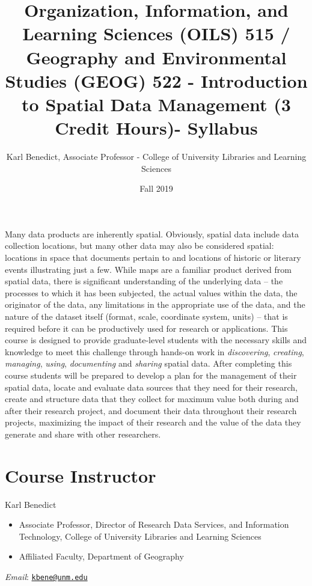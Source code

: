 \documentclass[
]{article}
\title{Organization, Information, and Learning Sciences (OILS) 515 / Geography
and Environmental Studies (GEOG) 522 - Introduction to Spatial Data
Management (3 Credit Hours)- Syllabus}
\author{Karl Benedict, Associate Professor - College of University Libraries and
Learning Sciences}
\date{Fall 2019}
\providecommand{\tightlist}{%
  \setlength{\itemsep}{0pt}\setlength{\parskip}{0pt}}
\begin{document}
\maketitle

Many data products are inherently spatial. Obviously, spatial data
include data collection locations, but many other data may also be
considered spatial: locations in space that documents pertain to and
locations of historic or literary events illustrating just a few. While
maps are a familiar product derived from spatial data, there is
significant understanding of the underlying data -- the processes to
which it has been subjected, the actual values within the data, the
originator of the data, any limitations in the appropriate use of the
data, and the nature of the dataset itself (format, scale, coordinate
system, units) -- that is required before it can be productively used
for research or applications. This course is designed to provide
graduate-level students with the necessary skills and knowledge to meet
this challenge through hands-on work in \emph{discovering},
\emph{creating}, \emph{managing}, \emph{using}, \emph{documenting} and
\emph{sharing} spatial data. After completing this course students will
be prepared to develop a plan for the management of their spatial data,
locate and evaluate data sources that they need for their research,
create and structure data that they collect for maximum value both
during and after their research project, and document their data
throughout their research projects, maximizing the impact of their
research and the value of the data they generate and share with other
researchers.

\hypertarget{course-instructor}{%
\section{Course Instructor}\label{course-instructor}}

Karl Benedict

\begin{itemize}
\tightlist
\item
  Associate Professor, Director of Research Data Services, and
  Information Technology, College of University Libraries and Learning
  Sciences
\item
  Affiliated Faculty, Department of Geography
\end{itemize}

\emph{Email}: \href{mailto:kbene@unm.edu}{\nolinkurl{kbene@unm.edu}}
\end{document}
